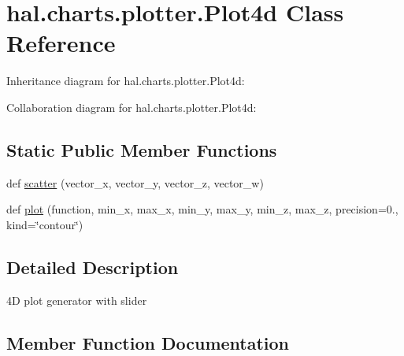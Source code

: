 \hypertarget{classhal_1_1charts_1_1plotter_1_1_plot4d}{}\section{hal.\+charts.\+plotter.\+Plot4d Class Reference}
\label{classhal_1_1charts_1_1plotter_1_1_plot4d}


Inheritance diagram for hal.\+charts.\+plotter.\+Plot4d\+:


Collaboration diagram for hal.\+charts.\+plotter.\+Plot4d\+:
\subsection*{Static Public Member Functions}
\begin{DoxyCompactItemize}
\item 
def \hyperlink{classhal_1_1charts_1_1plotter_1_1_plot4d_a54e937ece691908b033344968da476e6}{scatter} (vector\+\_\+x, vector\+\_\+y, vector\+\_\+z, vector\+\_\+w)
\item 
def \hyperlink{classhal_1_1charts_1_1plotter_1_1_plot4d_a8de036772398808b390cbf7ed0c11f93}{plot} (function, min\+\_\+x, max\+\_\+x, min\+\_\+y, max\+\_\+y, min\+\_\+z, max\+\_\+z, precision=0., kind=\char`\"{}contour\char`\"{})
\end{DoxyCompactItemize}


\subsection{Detailed Description}
\begin{DoxyVerb}4D plot generator with slider \end{DoxyVerb}
 

\subsection{Member Function Documentation}
